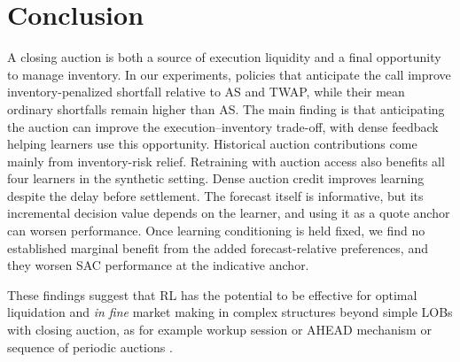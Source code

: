 \documentclass[11pt]{article}
\begin{document}
\section{Conclusion}
\label{sec:conclusion}
A closing auction is both a source of execution liquidity and a final opportunity to manage inventory. In our experiments, policies that anticipate the call improve inventory-penalized shortfall relative to AS and TWAP, while their mean ordinary shortfalls remain higher than AS. The main finding is that anticipating the auction can improve the execution--inventory trade-off, with dense feedback helping learners use this opportunity. Historical auction contributions come mainly from inventory-risk relief. Retraining with auction access also benefits all four learners in the synthetic setting. Dense auction credit improves learning despite the delay before settlement. The forecast itself is informative, but its incremental decision value depends on the learner, and using it as a quote anchor can worsen performance. Once learning conditioning is held fixed, we find no established marginal benefit from the added forecast-relative preferences, and they worsen SAC performance at the indicative anchor.\vspace{0.5em}

These findings suggest that RL has the potential to be effective for optimal liquidation and \textit{in fine} market making in complex structures beyond simple LOBs with closing auction, as for example workup session or AHEAD mechanism \cite{duffie2017size,derchu2024ahead} or sequence of periodic auctions \cite{milgrom1985economics,madhavan1992trading, budish2014implementation}.

\endgroup

\newpage



\end{document}
